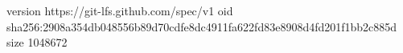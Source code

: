 version https://git-lfs.github.com/spec/v1
oid sha256:2908a354db048556b89d70cdfe8dc4911fa622fd83e8908d4fd201f1bb2c885d
size 1048672
